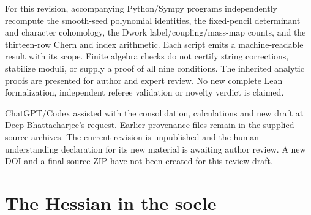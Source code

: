 For this revision, accompanying Python/Sympy programs independently
recompute the smooth-seed polynomial identities, the fixed-pencil
determinant and character cohomology, the Dwork label/coupling/mass-map
counts, and the thirteen-row Chern and index arithmetic.
Each script emits a machine-readable result with its scope.
Finite algebra checks do not certify string corrections, stabilize moduli,
or supply a proof of all nine conditions. The inherited analytic proofs
are presented for author and expert review. No new complete Lean
formalization, independent referee validation or novelty verdict is claimed.

ChatGPT/Codex assisted with the consolidation, calculations and new draft
at Deep Bhattacharjee's request. Earlier
provenance files remain in the supplied source archives. The current
revision is unpublished and the human-understanding declaration for its
new material is awaiting author review. A new DOI and a final source
ZIP have not been created for this review draft.

\appendix


\section{The Hessian in the socle}\label{app:hessian}

